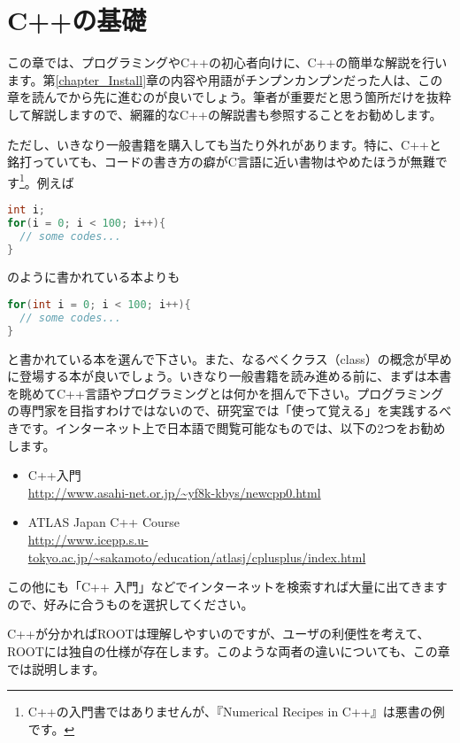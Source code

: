 \chapter{C++の基礎}
\label{chapter_C++}

この章では、プログラミングやC++の初心者向けに、C++の簡単な解説を行います。第\ref{chapter_Install}章の内容や用語がチンプンカンプンだった人は、この章を読んでから先に進むのが良いでしょう。筆者が重要だと思う箇所だけを抜粋して解説しますので、網羅的なC++の解説書も参照することをお勧めします。

ただし、いきなり一般書籍を購入しても当たり外れがあります。特に、C++と銘打っていても、コードの書き方の癖がC言語に近い書物はやめたほうが無難です\footnote{C++の入門書ではありませんが、『Numerical Recipes in C++』は悪書の例です。}。例えば
\begin{lstlisting}[language=c++]
int i;
for(i = 0; i < 100; i++){
  // some codes...
}
\end{lstlisting}
のように書かれている本よりも
\begin{lstlisting}[language=c++]
for(int i = 0; i < 100; i++){
  // some codes...
}
\end{lstlisting}
と書かれている本を選んで下さい。また、なるべくクラス（class）の概念が早めに登場する本が良いでしょう。いきなり一般書籍を読み進める前に、まずは本書を眺めてC++言語やプログラミングとは何かを掴んで下さい。プログラミングの専門家を目指すわけではないので、研究室では「使って覚える」を実践するべきです。インターネット上で日本語で閲覧可能なものでは、以下の2つをお勧めします。
\begin{itemize}
\item C++入門\\
\url{http://www.asahi-net.or.jp/~yf8k-kbys/newcpp0.html}
\item ATLAS Japan C++ Course\\
\url{http://www.icepp.s.u-tokyo.ac.jp/~sakamoto/education/atlasj/cplusplus/index.html}
\end{itemize}
この他にも「C++ 入門」などでインターネットを検索すれば大量に出てきますので、好みに合うものを選択してください。

C++が分かればROOTは理解しやすいのですが、ユーザの利便性を考えて、ROOTには独自の仕様が存在します。このような両者の違いについても、この章では説明します。 
\clearpage
